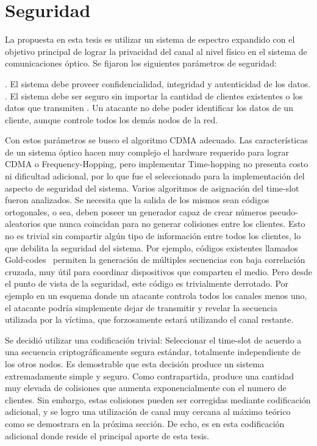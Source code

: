 \section{Seguridad}
\label{Seguridad}
La propuesta en esta tesis es utilizar un sistema de espectro expandido con el objetivo principal de lograr la privacidad del canal al nivel físico en el sistema de comunicaciones óptico.
Se fijaron los siguientes parámetros de seguridad:

. El sistema debe proveer confidencialidad, integridad y autenticidad de los datos.
. El sistema debe ser seguro sin importar la cantidad de clientes existentes o los datos que transmiten
. Un atacante no debe poder identificar los datos de un cliente, aunque controle todos los demás nodos de la red.

Con estos parámetros se busco el algoritmo CDMA adecuado. Las características de un sistema óptico hacen muy complejo el hardware requerido para lograr CDMA o Frequency-Hopping, pero implementar Time-hopping no presenta costo ni dificultad adicional, por lo que fue el seleccionado para la implementación del aspecto de seguridad del sistema.
Varios algoritmos de asignación del time-slot fueron analizados. Se necesita que la salida de los mismos sean códigos ortogonales, o sea, deben poseer un generador capaz de crear números pseudo-aleatorios que nunca coincidan para no generar colisiones entre los clientes. Esto no es trivial sin compartir algún tipo de información entre todos los clientes, lo que debilita la seguridad del sistema. Por ejemplo, códigos existentes llamados Gold-codes~\cite{gold1967optimal} permiten la generación de múltiples secuencias con baja correlación cruzada, muy útil para coordinar dispositivos que comparten el medio. Pero desde el punto de vista de la seguridad, este código es trivialmente derrotado. Por ejemplo en un esquema donde un atacante controla todos los canales menos uno, el atacante podría simplemente dejar de transmitir y revelar la secuencia utilizada por la víctima, que forzosamente estará utilizando el canal restante.

Se decidió utilizar una codificación trivial: Seleccionar el time-slot de acuerdo a una secuencia criptográficamente segura estándar, totalmente independiente de los otros nodos. Es demostrable que esta decisión produce un sistema extremadamente simple y seguro. Como contrapartida, produce una cantidad muy elevada de colisiones que aumenta exponencialmente con el numero de clientes. Sin embargo, estas colisiones pueden ser corregidas mediante codificación adicional, y se logro una utilización de canal muy cercana al máximo teórico como se demostrara en la próxima sección. De echo, es en esta codificación adicional donde reside el principal aporte de esta tesis.

